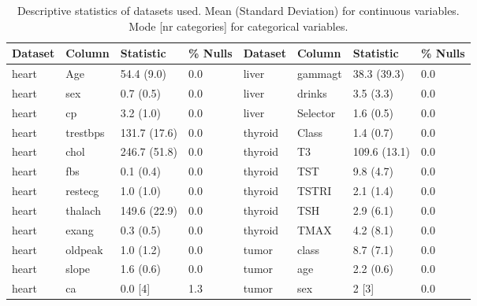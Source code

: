 \begin{small}    
\begin{table}[]
        \caption{Descriptive statistics of datasets used. Mean (Standard Deviation) for continuous variables. Mode [nr categories] for categorical variables.}\label{tab:descrptive_feature}
            \begin{tabularx}{\textwidth}{lXlllXll}
                \toprule
            Dataset & Column                         & Statistic    & \% Nulls & Dataset & Column          & Statistic    & \% Nulls \\
            \midrule
            heart   & Age                            & 54.4 (9.0)   & 0.0      & liver   & gammagt         & 38.3 (39.3)  & 0.0      \\
            heart   & sex                            & 0.7 (0.5)    & 0.0      & liver   & drinks          & 3.5 (3.3)    & 0.0      \\
            heart   & cp                             & 3.2 (1.0)    & 0.0      & liver   & Selector        & 1.6 (0.5)    & 0.0      \\
            heart   & trestbps                       & 131.7 (17.6) & 0.0      & thyroid & Class           & 1.4 (0.7)    & 0.0      \\
            heart   & chol                           & 246.7 (51.8) & 0.0      & thyroid & T3              & 109.6 (13.1) & 0.0      \\
            heart   & fbs                            & 0.1 (0.4)    & 0.0      & thyroid & TST             & 9.8 (4.7)    & 0.0      \\
            heart   & restecg                        & 1.0 (1.0)    & 0.0      & thyroid & TSTRI           & 2.1 (1.4)    & 0.0      \\
            heart   & thalach                        & 149.6 (22.9) & 0.0      & thyroid & TSH             & 2.9 (6.1)    & 0.0      \\
            heart   & exang                          & 0.3 (0.5)    & 0.0      & thyroid & TMAX            & 4.2 (8.1)    & 0.0      \\
            heart   & oldpeak                        & 1.0 (1.2)    & 0.0      & tumor   & class           & 8.7 (7.1)    & 0.0      \\
            heart   & slope                          & 1.6 (0.6)    & 0.0      & tumor   & age             & 2.2 (0.6)    & 0.0      \\
            heart   & ca                             & 0.0 {[}4{]}  & 1.3      & tumor   & sex             & 2 {[}3{]}    & 0.0      \\

\end{tabularx}
\end{table}
\end{small}
